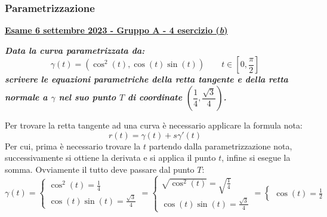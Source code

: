 \documentclass[a4paper]{article}
\newcommand{\definition}[1]{\textcolor{Red3}{\textbf{#1}}}
\newcommand{\example}[1]{\textcolor{Green4}{\textbf{#1}}}
\begin{document}
	\subsubsection{Parametrizzazione}
	\begin{flushleft}\label{exam: esame 06 settembre 2023 - Gruppo A - 4 esercizio (b)}
		\definition{\underline{Esame 6 settembre 2023 - Gruppo A - 4 esercizio (\emph{b})}}
	\end{flushleft}
	\example{\emph{Data la curva parametrizzata da:}
	\begin{equation*}
		\gamma\left(t\right) = \left(\cos^{2}\left(t\right), \cos\left(t\right) \sin\left(t\right)\right) \hspace{2em} t \in \left[0, \frac{\pi}{2}\right]
	\end{equation*}
	\emph{scrivere le equazioni parametriche della retta tangente e della retta normale a $\gamma$ nel suo punto $T$ di coordinate $\left(\dfrac{1}{4}, \dfrac{\sqrt{3}}{4}\right)$.}}\newline

	\noindent
	Per trovare la retta tangente ad una curva è necessario applicare la formula nota:
	\begin{equation*}
		r\left(t\right) = \gamma\left(t\right) + s\gamma'\left(t\right)
	\end{equation*}
	Per cui, prima è necessario trovare la $t$ partendo dalla parametrizzazione nota, successivamente si ottiene la derivata e si applica il punto $t$, infine si esegue la somma. Ovviamente il tutto deve passare dal punto $T$:
	\begin{equation*}
		\gamma\left(t\right) = \begin{cases}
			\cos^{2}\left(t\right) = \frac{1}{4} \\
			\cos\left(t\right) \sin\left(t\right) = \frac{\sqrt{3}}{4}
		\end{cases}
		=
		\begin{cases}
			\sqrt{\cos^{2}\left(t\right)} = \sqrt{\frac{1}{4}} \\
			\cos\left(t\right) \sin\left(t\right) = \frac{\sqrt{3}}{4}
		\end{cases}
		=
		\begin{cases}
			\cos\left(t\right) = \frac{1}{2}
		\end{cases}
	\end{equation*}


\end{document}
